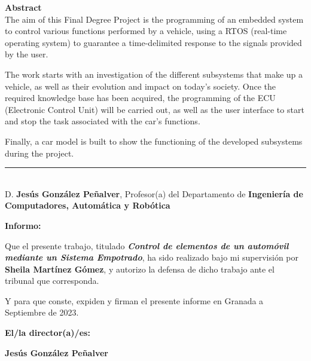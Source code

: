 \noindent\textbf{Abstract}\\

The aim of this Final Degree Project is the programming of an embedded system to control various functions performed by a vehicle, using a RTOS (real-time operating system) to guarantee a time-delimited response to the signals provided by the user.\newline

The work starts with an investigation of the different subsystems that make up a vehicle, as well as their evolution and impact on today's society. Once the required knowledge base has been acquired, the programming of the ECU (Electronic Control Unit) will be carried out, as well as the user interface to start and stop the task associated with the car's functions.\newline

Finally, a car model is built to show the functioning of the developed subsystems during the project.\newline

\cleardoublepage

\thispagestyle{empty}

\noindent\rule[-1ex]{\textwidth}{2pt}\\[4.5ex]

D. \textbf{Jesús González Peñalver}, Profesor(a) del Departamento de \textbf{Ingeniería de Computadores, Automática y Robótica}

\vspace{0.5cm}

\textbf{Informo:}

\vspace{0.5cm}

Que el presente trabajo, titulado \textit{\textbf{Control de elementos de un automóvil mediante un Sistema Empotrado}}, ha sido realizado bajo mi supervisión por \textbf{Sheila Martínez Gómez}, y autorizo la defensa de dicho trabajo ante el tribunal que corresponda.

\vspace{0.5cm}

Y para que conste, expiden y firman el presente informe en Granada a Septiembre de 2023.

\vspace{1cm}

\textbf{El/la director(a)/es: }

\vspace{5cm}

\noindent \textbf{Jesús González Peñalver}

